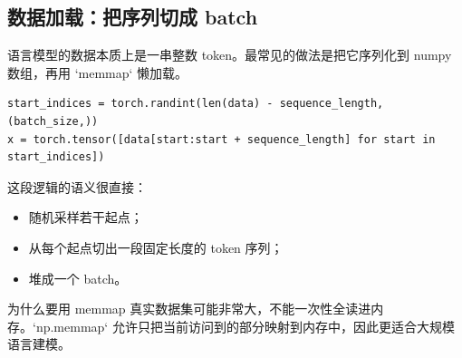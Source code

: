 \subsection{数据加载：把序列切成 batch}

语言模型的数据本质上是一串整数 token。最常见的做法是把它序列化到 numpy 数组，再用 `memmap` 懒加载。

\begin{lstlisting}
start_indices = torch.randint(len(data) - sequence_length, (batch_size,))
x = torch.tensor([data[start:start + sequence_length] for start in start_indices])
\end{lstlisting}

这段逻辑的语义很直接：
\begin{itemize}
    \item 随机采样若干起点；
    \item 从每个起点切出一段固定长度的 token 序列；
    \item 堆成一个 batch。
\end{itemize}

\begin{knowledgebox}{为什么要用 memmap}
真实数据集可能非常大，不能一次性全读进内存。`np.memmap` 允许只把当前访问到的部分映射到内存中，因此更适合大规模语言建模。
\end{knowledgebox}

